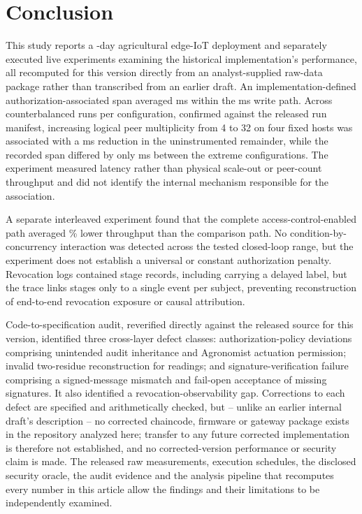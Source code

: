 \section{Conclusion}
\label{sec:conclusion}

This study reports a \DeploymentDays{}-day agricultural edge-IoT deployment and separately executed live experiments examining the historical implementation's performance, all recomputed for this version directly from an analyst-supplied raw-data package rather than transcribed from an earlier draft. An implementation-defined authorization-associated span averaged \SpanLatencyPeerFour{} ms within the \TotalLatencyPeerFour{} ms write path. Across \PeerRunsPerConfig{} counterbalanced runs per configuration, confirmed against the released run manifest, increasing logical peer multiplicity from 4 to 32 on four fixed hosts was associated with a \RemainingLatencyDiffFourVThirtyTwo{} ms reduction in the uninstrumented remainder, while the recorded span differed by only \SpanDiffFourVThirtyTwo{} ms between the extreme configurations. The experiment measured latency rather than physical scale-out or peer-count throughput and did not identify the internal mechanism responsible for the association.

A separate interleaved experiment found that the complete access-control-enabled path averaged \ThroughputPctDiffMean\% lower throughput than the comparison path. No condition-by-concurrency interaction was detected across the tested closed-loop range, but the experiment does not establish a universal or constant authorization penalty. Revocation logs contained \RevocationStageRecords{} stage records, including \RevocationDelayedCount{} carrying a delayed label, but the trace links stages only to a single event per subject, preventing reconstruction of end-to-end revocation exposure or causal attribution.

Code-to-specification audit, reverified directly against the released source for this version, identified three cross-layer defect classes: authorization-policy deviations comprising unintended audit inheritance and Agronomist actuation permission; invalid two-residue reconstruction for \CrtTwoResidueCount{} readings; and signature-verification failure comprising a signed-message mismatch and fail-open acceptance of missing signatures. It also identified a revocation-observability gap. Corrections to each defect are specified and arithmetically checked, but -- unlike an earlier internal draft's description -- no corrected chaincode, firmware or gateway package exists in the repository analyzed here; transfer to any future corrected implementation is therefore not established, and no corrected-version performance or security claim is made. The released raw measurements, execution schedules, the disclosed security oracle, the audit evidence and the analysis pipeline that recomputes every number in this article allow the findings and their limitations to be independently examined.
